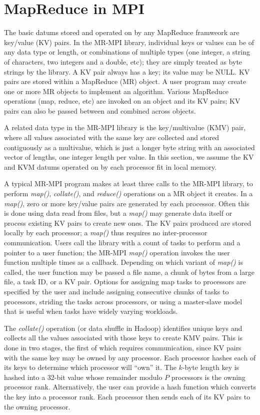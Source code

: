 \section{MapReduce in MPI}
\label{sec:mr}

The basic datums stored and operated on by any MapReduce framweork are
key/value (KV) pairs.  In the MR-MPI library, individual keys or
values can be of any data type or length, or combinations of multiple
types (one integer, a string of characters, two integers and a double,
etc); they are simply treated as byte strings by the library.  A KV
pair always has a key; its value may be NULL.  KV pairs are stored
within a MapReduce (MR) object.  A user program may create one or more
MR objects to implement an algorithm.  Various MapReduce operations
(map, reduce, etc) are invoked on an object and its KV pairs; KV pairs
can also be passed between and combined across objects.

A related data type in the MR-MPI library is the key/multivalue (KMV)
pair, where all values associated with the same key are collected and
stored contiguously as a multivalue, which is just a longer byte
string with an associated vector of lengths, one integer length per
value.  In this section, we assume the KV and KVM datums operated on
by each processor fit in local memory.

A typical MR-MPI program makes at least three calls to the MR-MPI
library, to perform {\it map()}, {\it collate()}, and {\it reduce()}
operations on a MR object it creates.  In a {\it map()}, zero or more
key/value pairs are generated by each processor.  Often this is done
using data read from files, but a {\it map()} may generate data itself
or process existing KV pairs to create new ones.  The KV pairs
produced are stored locally by each processor; a {\it map()} thus
requires no inter-processor communication.  Users call the library
with a count of tasks to perform and a pointer to a user function; the
MR-MPI {\it map()} operation invokes the user function multiple times
as a callback.  Depending on which variant of {\it map()} is called,
the user function may be passed a file name, a chunk of bytes from a
large file, a task ID, or a KV pair.  Options for assigning map tasks
to processors are specified by the user and include assigning
consecutive chunks of tasks to processors, striding the tasks across
processors, or using a master-slave model that is useful when tasks
have widely varying workloads.

The {\it collate()} operation (or data shuffle in Hadoop) identifies
unique keys and collects all the values associated with those keys to
create KMV pairs.  This is done in two stages, the first of which
requires communication, since KV pairs with the same key may be owned
by any processor.  Each processor hashes each of its keys to determine
which processor will ``own'' it.  The $k$-byte length key is hashed
into a 32-bit value whose remainder modulo $P$ processors is the
owning processor rank.  Alternatively, the user can provide a hash
function which converts the key into a processor rank.  Each processor
then sends each of its KV pairs to the owning processor.

